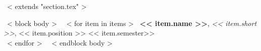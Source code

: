 ~< extends "section.tex" >~

~< block body >~
~< for item in items >~
  \textbf{<< item.name >>},
  \emph{<< item.short >>},
  << item.position >>
  \hfill << item.semester>> \\
~< endfor >~
~< endblock body >~
